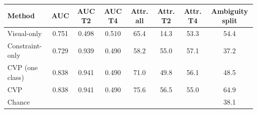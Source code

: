 \begin{tabular}{lccccccc}
\toprule
Method & AUC & AUC T2 & AUC T4 & Attr. all & Attr. T2 & Attr. T4 & Ambiguity split\\
\midrule
Visual-only & 0.751 & 0.498 & 0.510 & 65.4 & 14.3 & 53.3 & 54.4\\
Constraint-only & 0.729 & 0.939 & 0.490 & 58.2 & 55.0 & 57.1 & 37.2\\
CVP (one class) & 0.838 & 0.941 & 0.490 & 71.0 & 49.8 & 56.1 & 48.5\\
CVP & 0.838 & 0.941 & 0.490 & 75.6 & 56.5 & 55.0 & 64.9\\
\midrule
Chance & & & & & & & 38.1\\
\bottomrule
\end{tabular}
